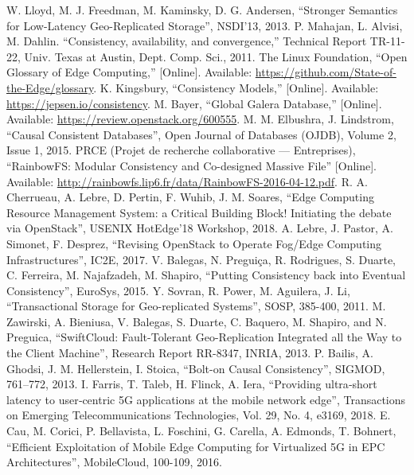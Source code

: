 \documentclass[conference]{IEEEtran}
\begin{document}
\begin{thebibliography}{00}
 W. Lloyd, M. J. Freedman, M. Kaminsky, D. G. Andersen, ``Stronger Semantics for Low-Latency Geo-Replicated Storage'', NSDI'13, 2013.
\newpage
{} P. Mahajan, L. Alvisi, M. Dahlin. ``Consistency, availability, and convergence,'' Technical Report TR-11-22, Univ. Texas at Austin, Dept. Comp. Sci., 2011.
 The Linux Foundation, ``Open Glossary of Edge Computing,'' [Online]. \newline Available: \url{https://github.com/State-of-the-Edge/glossary}.
 K. Kingsbury, ``Consistency Models,'' [Online]. Available: \newline \url{https://jepsen.io/consistency}.
 M. Bayer, ``Global Galera Database,'' [Online]. Available: \newline \url{https://review.openstack.org/600555}.
 M. M. Elbushra, J. Lindstrom, ``Causal Consistent Databases'', Open Journal of Databases (OJDB), Volume 2, Issue 1, 2015.
 PRCE (Projet de recherche collaborative — Entreprises), ``RainbowFS: Modular Consistency and Co-designed Massive File'' [Online]. Available: \url{http://rainbowfs.lip6.fr/data/RainbowFS-2016-04-12.pdf}.
 R. A. Cherrueau, A. Lebre, D. Pertin, F. Wuhib, J. M. Soares, ``Edge Computing Resource Management System: a Critical Building Block! Initiating the debate via OpenStack'', USENIX HotEdge’18 Workshop, 2018.
 A. Lebre, J. Pastor, A. Simonet, F. Desprez, ``Revising OpenStack to Operate Fog/Edge Computing Infrastructures'', IC2E, 2017.
 V. Balegas, N. Preguiça, R. Rodrigues, S. Duarte, C. Ferreira, M. Najafzadeh, M. Shapiro, ``Putting Consistency back into Eventual Consistency'', EuroSys, 2015.
 Y. Sovran, R. Power, M. Aguilera, J. Li, ``Transactional Storage for Geo-replicated Systems'', SOSP, 385-400, 2011.
 M. Zawirski, A. Bieniusa, V. Balegas, S. Duarte, C. Baquero, M. Shapiro, and N. Preguica, ``SwiftCloud: Fault-Tolerant Geo-Replication Integrated all the Way to the Client Machine'', Research Report RR-8347, INRIA, 2013.
 P. Bailis, A. Ghodsi, J. M. Hellerstein, I. Stoica, ``Bolt-on Causal Consistency'', SIGMOD, 761–772, 2013.
 I. Farris, T. Taleb, H. Flinck, A. Iera, ``Providing ultra‐short latency to user‐centric 5G applications at the mobile network edge'', Transactions on Emerging Telecommunications Technologies, Vol. 29, No. 4, e3169, 2018.
 E. Cau, M. Corici, P. Bellavista, L. Foschini, G. Carella, A. Edmonds, T. Bohnert, ``Efficient Exploitation of Mobile Edge Computing for Virtualized 5G in EPC Architectures'', MobileCloud, 100-109, 2016.

\end{thebibliography}
\end{document}
